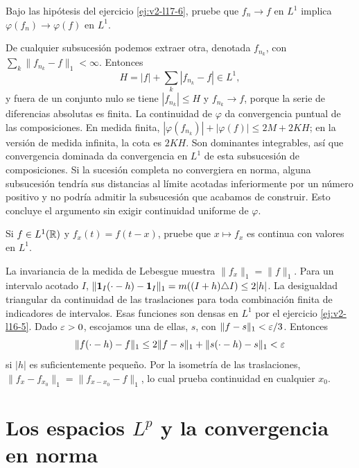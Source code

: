 \begin{ejercicio}\label{ej:v2-l17-7}
Bajo las hipótesis del ejercicio \ref{ej:v2-l17-6}, pruebe que $f_n\to f$ en $L^1$ implica $\varphi(f_n)\to\varphi(f)$ en $L^1$.
\end{ejercicio}
\begin{solucion}
De cualquier subsucesión podemos extraer otra, denotada $f_{n_k}$, con $\sum_k\|f_{n_k}-f\|_1<\infty$. Entonces
\[H=|f|+\sum_k|f_{n_k}-f|\in L^1,
\]
y fuera de un conjunto nulo se tiene $|f_{n_k}|\le H$ y $f_{n_k}\to f$, porque la serie de diferencias absolutas es finita. La continuidad de $\varphi$ da convergencia puntual de las composiciones. En medida finita, $|\varphi(f_{n_k})|+|\varphi(f)|\le2M+2KH$; en la versión de medida infinita, la cota es $2KH$. Son dominantes integrables, así que convergencia dominada da convergencia en $L^1$ de esta subsucesión de composiciones. Si la sucesión completa no convergiera en norma, alguna subsucesión tendría sus distancias al límite acotadas inferiormente por un número positivo y no podría admitir la subsucesión que acabamos de construir. Esto concluye el argumento sin exigir continuidad uniforme de $\varphi$.
\end{solucion}

\begin{ejercicio}\label{ej:v2-l17-8}
Si $f\in L^1(\mathbb R)$ y $f_x(t)=f(t-x)$, pruebe que $x\mapsto f_x$ es continua con valores en $L^1$.
\end{ejercicio}
\begin{solucion}
La invariancia de la medida de Lebesgue muestra $\|f_x\|_1=\|f\|_1$. Para un intervalo acotado $I$, $\|\mathbf1_{I}(\cdot-h)-\mathbf1_{I}\|_1=m((I+h)\triangle I)\le2|h|$. La desigualdad triangular da continuidad de las traslaciones para toda combinación finita de indicadores de intervalos. Esas funciones son densas en $L^1$ por el ejercicio \ref{ej:v2-l16-5}. Dado $\varepsilon>0$, escojamos una de ellas, $s$, con $\|f-s\|_1<\varepsilon/3$. Entonces
\[\|f(\cdot-h)-f\|_1\le2\|f-s\|_1+\|s(\cdot-h)-s\|_1<\varepsilon
\]
si $|h|$ es suficientemente pequeño. Por la isometría de las traslaciones, $\|f_x-f_{x_0}\|_1=\|f_{x-x_0}-f\|_1$, lo cual prueba continuidad en cualquier $x_0$.
\end{solucion}

\chapter{Los espacios \texorpdfstring{$L^p$}{Lp} y la convergencia en norma}

